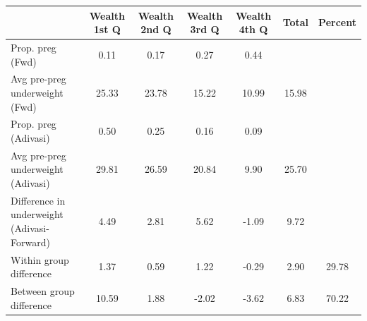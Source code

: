 \begin{tabular}{l*{6}{c}}
\toprule
            &\multicolumn{1}{c}{Wealth 1st Q}&\multicolumn{1}{c}{Wealth 2nd Q}&\multicolumn{1}{c}{Wealth 3rd Q}&\multicolumn{1}{c}{Wealth 4th Q}&\multicolumn{1}{c}{Total}&\multicolumn{1}{c}{Percent}\\
\midrule
\midrule
Prop. preg (Fwd)&        0.11&        0.17&        0.27&        0.44&            &            \\
Avg pre-preg underweight (Fwd)&       25.33&       23.78&       15.22&       10.99&       15.98&            \\
Prop. preg (Adivasi)&        0.50&        0.25&        0.16&        0.09&            &            \\
Avg pre-preg underweight (Adivasi)&       29.81&       26.59&       20.84&        9.90&       25.70&            \\
Difference in underweight (Adivasi-Forward)&        4.49&        2.81&        5.62&       -1.09&        9.72&            \\
Within group difference&        1.37&        0.59&        1.22&       -0.29&        2.90&       29.78\\
Between group difference&       10.59&        1.88&       -2.02&       -3.62&        6.83&       70.22\\
\bottomrule
\end{tabular}
